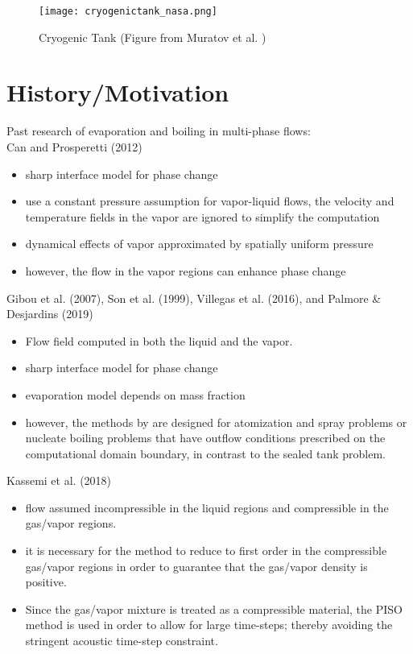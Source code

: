 \documentclass[]{article}
\begin{document}
\begin{figure}[h]
\centering
\texttt{[image: cryogenictank\_nasa.png]}
\caption*{Cryogenic Tank (Figure from Muratov et al. \cite{Muratov2011})}
\end{figure}

\FloatBarrier
		
\section*{History/Motivation} 
Past research of evaporation and boiling in multi-phase flows:\\
Can and Prosperetti (2012)\cite{CAN2012}
\begin{itemize}
\item sharp interface model for phase change
\item use a constant pressure assumption for vapor-liquid flows, 
  the velocity and temperature fields in the vapor are 
  ignored to simplify the computation 
\item dynamical effects of vapor approximated by spatially uniform pressure
\item however, the flow in the vapor regions can enhance phase change
\end{itemize}
Gibou et al. (2007)\cite{GIBOU2007}, 
Son et al. (1999)\cite{Son1999}, 
Villegas et al. (2016)\cite{VILLEGAS2016}, and 
Palmore \& Desjardins (2019)\cite{PALMORE2019}
\begin{itemize}
\item Flow field computed in both the liquid and the vapor.
\item sharp interface model for phase change
\item evaporation model depends on mass fraction
\item however, the methods by 
  \cite{GIBOU2007,Son1999,VILLEGAS2016,PALMORE2019} are 
  designed for atomization and spray problems or nucleate boiling problems
  that have outflow conditions prescribed on the computational domain
  boundary, in contrast to the sealed tank problem.
\end{itemize}
Kassemi et al. (2018)\cite{KASSEMI2018}
\begin{itemize}
\item flow assumed incompressible in the liquid 
  regions and compressible in the gas/vapor regions.
\item it is necessary for the method to reduce to first order in the
  compressible gas/vapor regions in order to guarantee that the gas/vapor 
  density is positive.
\item Since the gas/vapor mixture
  is treated as a compressible material, the 
  PISO method is used in order to allow for large time-steps; 
  thereby avoiding the stringent acoustic time-step constraint.
\end{itemize}
	
\end{document}
